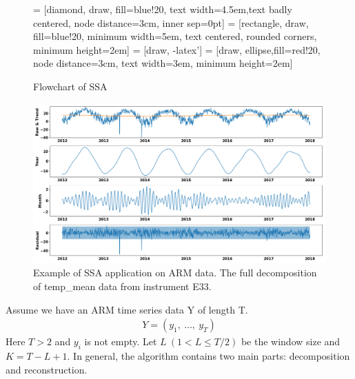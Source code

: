 \documentclass[letterpaper, 10 pt, conference]{ieeeconf}  %
\begin{document}
\begin{figure}[ht]
    \centering
     = [diamond, draw, fill=blue!20, text width=4.5em,text badly centered, node distance=3cm, inner sep=0pt]
     = [rectangle, draw, fill=blue!20, minimum width=5em, text centered, rounded corners, minimum height=2em]
     = [draw, -latex']
     = [draw, ellipse,fill=red!20, node distance=3cm, text width=3em, minimum height=2em]
    \caption{Flowchart of SSA}
    \label{fig:pcs}
\end{figure}

\begin{figure}[ht]
    \centering
    \includegraphics[width=\textwidth]{E33.png}
    \caption{Example of SSA application on ARM data. The full decomposition of temp\_mean data from instrument E33.}
    \label{fig:ssa}
\end{figure}

Assume we have an ARM time series data Y of length T.
\begin{align*}
Y =(y_1,\ \ldots,\ y_T)
\end{align*}
Here $T > 2$ and $y_i$ is not empty. Let $L\ (1 < L \leq T/2)$ be the window size and $K = T - L + 1$. In general, the algorithm contains two main parts: decomposition and reconstruction.
\end{document}
